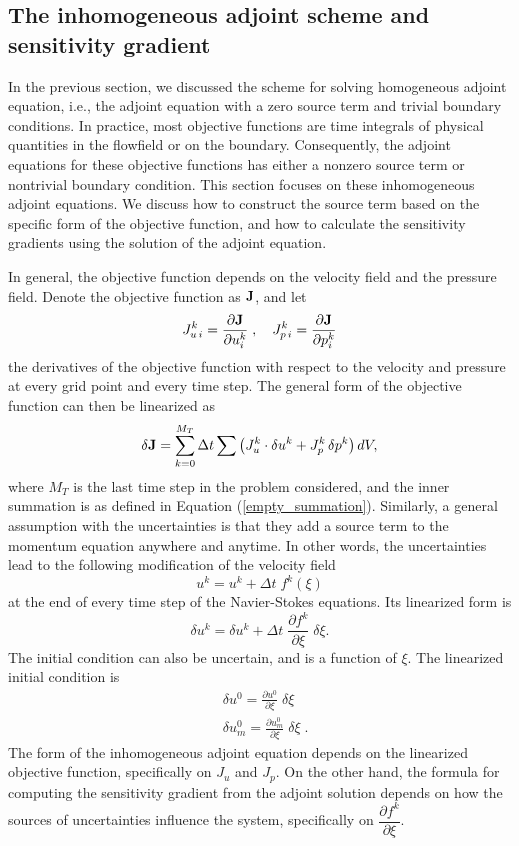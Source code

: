 \subsection{The inhomogeneous adjoint scheme and sensitivity gradient}

In the previous section, we discussed the scheme for solving homogeneous adjoint
equation, i.e., the adjoint equation with a zero source term and trivial
boundary conditions.  In practice, most objective functions are
time integrals of physical quantities in the flowfield or on the boundary.
Consequently, the adjoint equations for these objective functions has either
a nonzero source term or nontrivial boundary condition.
This section focuses on these inhomogeneous adjoint equations.
We discuss how to construct the source term based on the specific form of
the objective function, and how to calculate the sensitivity gradients using
the solution of the adjoint equation.

In general, the objective function depends on the velocity field and the
pressure field.  Denote the objective function as $\bf J$, and let
\[ J_{u\,i}^k = \frac{\partial {\bf J}}{\partial u_i^k} \;,\quad
   J_{p\,i}^k = \frac{\partial {\bf J}}{\partial p_i^k} \]
the derivatives of the objective function with respect to the velocity and
pressure at every grid point and every time step.
The general form of the objective function can then be linearized as
\[ \delta {\bf J} = \sum_{k=0}^{M_T} \Delta t
            \sum \left(J_u^k \cdot \delta u^k + J_p^k\,\delta p^k\right) dV ,\]
where $M_T$ is the last time step in the problem considered, and the
inner summation is as defined in Equation (\ref{empty_summation}).
Similarly, a general assumption with the uncertainties is that they add a source
term to the momentum equation anywhere and anytime.  In other words,
the uncertainties lead to the following modification of the velocity field
\[ u^k = u^k + \Delta t\; f^k(\xi) \]
at the end of every time step of the Navier-Stokes equations.
Its linearized form is
\begin{equation} \label{source_linearns}
\delta u^k = \delta u^k + \Delta t\;
             \frac{\partial f^k}{\partial \xi}\;\delta\xi .
\end{equation}
The initial condition can also be uncertain, and is a function of $\xi$.
The linearized initial condition is
\[ \begin{split}
& \delta u^0 = \frac{\partial u^0}{\partial \xi}\;\delta\xi \\
& \delta u_m^0 = \frac{\partial u_m^0}{\partial \xi}\;\delta\xi \;.
\end{split} \]
The form of the inhomogeneous adjoint equation depends on the linearized
objective function, specifically on $J_u$ and $J_p$.  On the other hand,
the formula for computing the sensitivity gradient from the adjoint solution
depends on how the sources of uncertainties influence the system, specifically
on $\dfrac{\partial f^k}{\partial \xi}$.

